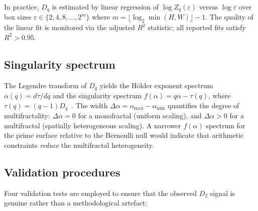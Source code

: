 \documentclass[final,1p,times]{elsarticle}
\theoremstyle{definition}
\begin{document}
In practice, $D_q$ is estimated by linear regression of
$\log Z_q(\varepsilon)$ versus $\log \varepsilon$ over box sizes
$\varepsilon \in \{2, 4, 8, \ldots, 2^{m}\}$ where
$m = \lfloor \log_2 \min(H,W) \rfloor - 1$. The quality of the linear
fit is monitored via the adjusted $R^2$ statistic; all reported fits
satisfy $R^2 > 0.95$.

\subsection{Singularity spectrum}

The Legendre transform of $D_q$ yields the H\"older exponent spectrum
$\alpha(q) = d\tau/dq$ and the singularity spectrum
$f(\alpha) = q\alpha - \tau(q)$, where
$\tau(q) = (q-1)D_q$~\cite{HENTSCHEL-PROCACCIA-1983}. The width
$\Delta\alpha = \alpha_{\max} - \alpha_{\min}$ quantifies the degree of
multifractality: $\Delta\alpha = 0$ for a monofractal (uniform scaling),
and $\Delta\alpha > 0$ for a multifractal (spatially heterogeneous
scaling). A narrower $f(\alpha)$ spectrum for the prime surface relative
to the Bernoulli null would indicate that arithmetic constraints
\emph{reduce} the multifractal heterogeneity.

\subsection{Validation procedures}

Four validation tests are employed to ensure that the observed $D_2$
signal is genuine rather than a methodological artefact:
\end{document}
